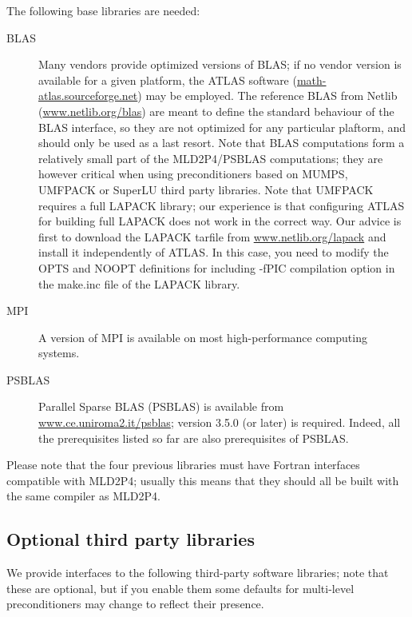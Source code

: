 The following base libraries are needed: 
\begin{description}
\item[BLAS] \cite{blas3,blas2,blas1} Many vendors provide optimized versions
  of BLAS; if no vendor version is
  available for a given platform, the ATLAS software
  (\url{math-atlas.sourceforge.net})
  may be employed.  The reference BLAS from Netlib
  (\url{www.netlib.org/blas}) are meant to define the standard
  behaviour of the BLAS interface, so they are not optimized for any
  particular plaftorm, and should only be used as a last
  resort. Note that BLAS computations form a relatively small part of
  the MLD2P4/PSBLAS computations; they are however critical when using
  preconditioners based on MUMPS, UMFPACK or SuperLU third party
  libraries. Note that UMFPACK requires a full LAPACK library; our
experience is that configuring ATLAS for building full LAPACK does not
work in the correct way. Our advice is first to download the LAPACK tarfile from
\url{www.netlib.org/lapack} and install it independently of ATLAS. In this case,
you need to modify the OPTS and NOOPT definitions for including -fPIC compilation option
in the make.inc file of the LAPACK library. 
\item[MPI] \cite{MPI2,MPI1} A version of MPI is available on most
  high-performance computing systems.
 \item[PSBLAS] \cite{PSBLASGUIDE,psblas_00} Parallel Sparse BLAS (PSBLAS) is
  available from \url{www.ce.uniroma2.it/psblas}; version
  3.5.0  (or later) is required. Indeed, all the prerequisites
  listed so far are also prerequisites of PSBLAS.
\end{description}
Please note that the four previous libraries must have Fortran
interfaces compatible with MLD2P4;
usually this means that they should all be built with the same
compiler as MLD2P4.

\subsection{Optional third party libraries\label{sec:third_party}}

We provide interfaces to the following third-party software libraries;
note that these are optional, but if you enable them some defaults
for multi-level preconditioners may change to reflect their presence. 

